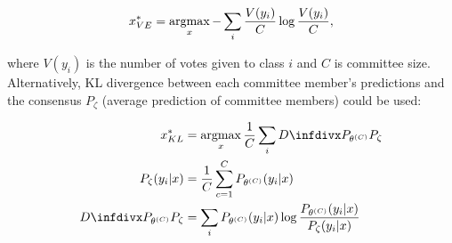 \begin{equation}
 x^*_{VE} = \operatorname*{argmax}_x - \sum_{i} \frac{V(y_i)}{C}  \log \frac{V(y_i)}{C},
\end{equation}

where $V(y_i)$ is the number of votes given to class $i$ and $C$ is committee size.
Alternatively, KL divergence between each committee member's predictions and the consensus $P_\zeta$ (average prediction of committee members) could be used:

\begin{align}
 x^*_{KL} &= \argmax_x \frac{1}{C} \sum_{i} \infdiv{P_{\theta^{(C)}}}{P_\zeta}\\
 P_\zeta(y_i | x) &= \frac{1}{C} \sum_{c=1}^C P_{\theta^{(C)}}(y_i|x)\\
 \infdiv{P_{\theta^{(C)}}}{P_\zeta} &= \sum_i  P_{\theta^{(C)}}(y_i|x) \log \frac{ P_{\theta^{(C)}}(y_i|x) }{ P_{\zeta}(y_i|x) }
\end{align}
